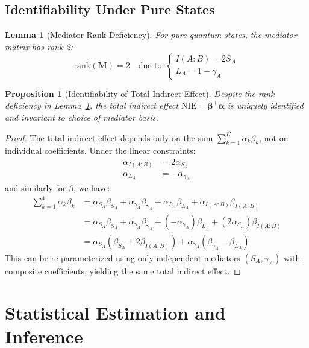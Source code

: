 \documentclass[
    reprint,
    amsmath, amssymb,
    aps,
    floatfix,
    nofootinbib
]{revtex4-1}
\newtheorem{lemma}[theorem]{Lemma}
\newtheorem{proposition}{Proposition}
\begin{document}
\subsection{Identifiability Under Pure States}
\begin{lemma}[Mediator Rank Deficiency]\label{lem:rank_deficiency}
For pure quantum states, the mediator matrix has rank 2:
\begin{equation}
    \text{rank}(\bm{M}) = 2 \quad \text{due to } \begin{cases}
I(A:B) = 2S_A \\
L_A = 1 - \gamma_A
\end{cases}
\end{equation}
\end{lemma}

\begin{proposition}[Identifiability of Total Indirect Effect]\label{prop:identifiable_indirect}
Despite the rank deficiency in Lemma~\ref{lem:rank_deficiency}, the total indirect effect $\text{NIE} = \bm{\beta}^\top\bm{\alpha}$ is uniquely identified and invariant to choice of mediator basis.
\end{proposition}

\begin{proof}
The total indirect effect depends only on the sum $\sum_{k=1}^K \alpha_k\beta_k$, not on individual coefficients. Under the linear constraints:
\begin{align}
\alpha_{I(A:B)} &= 2\alpha_{S_A} \\
\alpha_{L_A} &= -\alpha_{\gamma_A}
\end{align}
and similarly for $\beta$, we have:
\begin{align}
\sum_{k=1}^4 \alpha_k\beta_k &= \alpha_{S_A}\beta_{S_A} + \alpha_{\gamma_A}\beta_{\gamma_A} + \alpha_{L_A}\beta_{L_A} + \alpha_{I(A:B)}\beta_{I(A:B)} \\
&= \alpha_{S_A}\beta_{S_A} + \alpha_{\gamma_A}\beta_{\gamma_A} + (-\alpha_{\gamma_A})\beta_{L_A} + (2\alpha_{S_A})\beta_{I(A:B)} \\
&= \alpha_{S_A}(\beta_{S_A} + 2\beta_{I(A:B)}) + \alpha_{\gamma_A}(\beta_{\gamma_A} - \beta_{L_A})
\end{align}
This can be re-parameterized using only independent mediators $(S_A, \gamma_A)$ with composite coefficients, yielding the same total indirect effect.
\end{proof}

\section{Statistical Estimation and Inference}\label{sec:inference}
\end{document}
